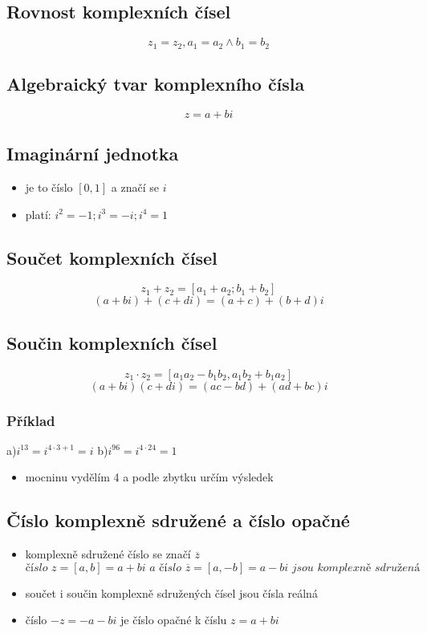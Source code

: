 \subsection{Rovnost komplexních čísel}
    $$
        z_1=z_2, a_1=a_2  \wedge b_1=b_2
    $$
    
\subsection{Algebraický tvar komplexního čísla}
    $$
        z=a+bi
    $$
    
\subsection{Imaginární jednotka}
    \begin{itemize}
        \item je to číslo $[0,1]$ a značí se $i$
        \item platí: $i^2 = -1;i^3=-i; i^4=1$
    \end{itemize}
    
\subsection{Součet komplexních čísel}
    $$
        z_1+z_2 = [a_1+a_2;b_1+b_2]
    $$
    $$
        (a+bi)+(c+di) = (a+c) + (b+d)i
    $$
    
\subsection{Součin komplexních čísel}
    $$ 
        z_1 \cdot z_2 = [a_1 a_2 - b_1 b_2,a_1 b_2 + b_1 a_2]
    $$
    $$
        (a + bi)(c + di) = (ac - bd) + (ad + bc)i
    $$
    
\subsubsection{Příklad}
    a)$i^{13}=i^{4 \cdot 3+1}=i$ b)$i^{96}=i^{4 \cdot 24}=1$
    \begin{itemize}
        \item mocninu vydělím 4 a podle zbytku určím výsledek
    \end{itemize}
    
\subsection{Číslo komplexně sdružené a číslo opačné}
    \begin{itemize}
        \item komplexně sdružené číslo se značí $\overline{z}$
    $$
        \textit{číslo } z = [a,b] = a + bi \textit{ a číslo } \overline{z} = [a,-b] = a - bi \textit{ jsou komplexně sdružená}
    $$
        \item součet i součin komplexně sdružených čísel jsou čísla reálná
        \item číslo $-z = -a - bi$ je číslo opačné k číslu $z = a + bi$
    \end{itemize}
    
